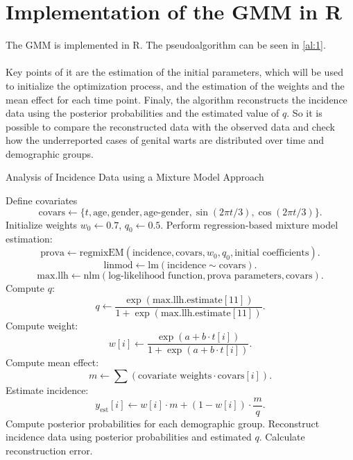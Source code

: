 \documentclass[a4paper,12pt]{article}
\begin{document}
\section{Implementation of the GMM in R}
The GMM is implemented in R. The pseudoalgorithm can be seen in \ref{al:1}.
\\\\
Key points of it are the estimation of the initial parameters, which will be used to initialize the optimization process, and the estimation of the weights and the mean effect for each time point. Finaly, the algorithm reconstructs the incidence data using the posterior probabilities and the estimated value of $q$. So it is possible to compare the reconstructed data with the observed data and check how the underreported cases of genital warts are distributed over time and demographic groups.
\begin{algorithm}
    \label{al:1}
    \caption{Analysis of Incidence Data using a Mixture Model Approach}
    \begin{algorithmic}[1]
     Define covariates
    \[
    \text{covars} \gets \{t, \text{age}, \text{gender}, \text{age-gender}, \sin(2\pi t / 3), \cos(2\pi t / 3)\}.
    \]
    \STATE Initialize weights $w_0 \gets 0.7$, $q_0 \gets 0.5$.
    \STATE Perform regression-based mixture model estimation:
    \[
    \text{prova} \gets \text{regmixEM}(\text{incidence}, \text{covars}, w_0, q_0, \text{initial coefficients}).
    \]
    \[
    \text{linmod} \gets \text{lm}(\text{incidence} \sim \text{covars}).
    \]
    \[
    \text{max.llh} \gets \text{nlm}(\text{log-likelihood function}, \text{prova parameters}, \text{covars}).
    \]
    \STATE Compute $q$:
    \[
    q \gets \frac{\exp(\text{max.llh.estimate}[11])}{1 + \exp(\text{max.llh.estimate}[11])}.
    \]
        \STATE Compute weight:
        \[
        w[i] \gets \frac{\exp(a + b \cdot t[i])}{1 + \exp(a + b \cdot t[i])}.
        \]
        \STATE Compute mean effect:
        \[
        m \gets \sum (\text{covariate weights} \cdot \text{covars}[i]).
        \]
        \STATE Estimate incidence:
        \[
        y_\text{est}[i] \gets w[i] \cdot m + (1 - w[i]) \cdot \frac{m}{q}.
        \]
    \ENDFOR
     Compute posterior probabilities for each demographic group.
     Reconstruct incidence data using posterior probabilities and estimated $q$.
    \STATE Calculate reconstruction error.
    \end{algorithmic}
\end{algorithm}
\newpage
\end{document}
